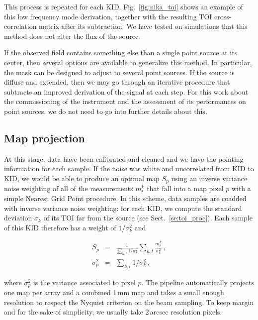 This process is repeated for each KID. Fig.~\ref{fig:nika_toi} shows an example
of this low frequency mode derivation, together with the resulting TOI
cross-correlation matrix after its subtraction. We have tested on simulations
that this method does not alter the flux of the
source.

If the observed field contains something else than a single point source at its
center, then several options are available to generalize this method. In
particular, the mask can be designed to adjust to several point sources. If the
source is diffuse and extended, then we may go through an iterative procedure that
subtracts an improved derivation of the signal at each step. For this work about
the commissioning of the instrument and the assessment of its performances on
point sources, we do not need to go into further details about this.

\subsection{Map projection}
\label{se:map_projection}

At this stage, data have been calibrated and cleaned and we have the pointing
information for each sample. If the noise was white and uncorrelated from KID to
KID, we would be able to produce an optimal map $S_p$ using an inverse
variance noise weighting of all of the measurements $m^k_t$ that fall
into a map pixel $p$ with a simple Nearest Grid Point procedure. In
this scheme, data samples are coadded with inverse variance noise
weighting: for each KID, we compute the standard deviation
$\sigma_k$ of its TOI far from the source (see Sect.~\ref{se:toi_proc}). Each
sample of this KID therefore has a weight of $1/\sigma_k^2$ and

\begin{eqnarray}
S_p        &=& \frac{1}{\sum_{k,t}1/\sigma_k^2}\sum_{k,t} \frac{m^k_t}{\sigma_k^2}\,, \label{eq:ngp_sum}\\
\sigma^2_p &=& \sum_{k,t}1/\sigma_k^2\,, \label{eq:ngp_var}
\end{eqnarray}

where $\sigma^2_p$ is the variance associated to pixel $p$. The
pipeline automatically projects one map per array and a combined 1\,mm
map and takes a small enough resolution to respect the Nyquist
criterion on the beam sampling.
To keep margin
and for the sake of simplicity, we usually take 2\,arcsec resolution pixels.

